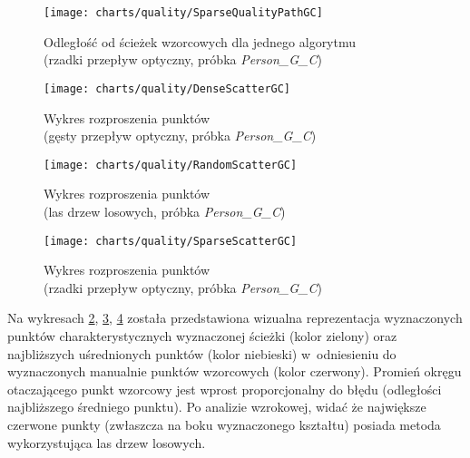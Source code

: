       \begin{figure}[!ht]
        \centering
        \texttt{[image: charts/quality/SparseQualityPathGC]}
        \caption[Odległość od ścieżek wzorcowych dla jednego algorytmu (rzadki przepływ optyczny, osoba G, gest C)]
                {Odległość od ścieżek wzorcowych dla jednego algorytmu\\(rzadki przepływ optyczny, próbka \textit{Person\_G\_C})}
        \label{fig:SparseQualityPathGC}
      \end{figure}

    \newpage
      \begin{figure}[!ht]
        \centering
        \texttt{[image: charts/quality/DenseScatterGC]}
        \caption[Wykres rozproszenia punktów (gęsty przepływ optyczny)]
                {Wykres rozproszenia punktów\\(gęsty przepływ optyczny, próbka \textit{Person\_G\_C})}
        \label{fig:DenseScatterGC}
      \end{figure}

      \begin{figure}[!ht]
        \centering
        \texttt{[image: charts/quality/RandomScatterGC]}
        \caption[Wykres rozproszenia punktów (las drzew losowych)]
                {Wykres rozproszenia punktów\\(las drzew losowych, próbka \textit{Person\_G\_C})}
        \label{fig:RandomScatterGC}
      \end{figure}

    \newpage
      \begin{figure}[!ht]
        \centering
        \texttt{[image: charts/quality/SparseScatterGC]}
        \caption[Wykres rozproszenia punktów (rzadki przepływ optyczny)]
                {Wykres rozproszenia punktów\\(rzadki przepływ optyczny, próbka \textit{Person\_G\_C})}
        \label{fig:SparseScatterGC}
      \end{figure}

    Na wykresach \ref{fig:DenseScatterGC}, \ref{fig:RandomScatterGC}, \ref{fig:SparseScatterGC} została przedstawiona wizualna reprezentacja wyznaczonych punktów charakterystycznych wyznaczonej ścieżki (kolor zielony) oraz najbliższych uśrednionych punktów (kolor niebieski) w~odniesieniu do wyznaczonych manualnie punktów wzorcowych (kolor czerwony). Promień okręgu otaczającego punkt wzorcowy jest wprost proporcjonalny do błędu (odległości najbliższego średniego punktu). Po analizie wzrokowej, widać że największe czerwone punkty (zwłaszcza na boku wyznaczonego kształtu) posiada metoda wykorzystująca las drzew losowych.

